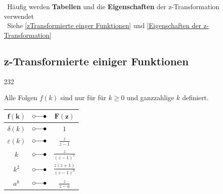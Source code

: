 \textrightarrow\ Häufig werden \textbf{Tabellen} und die \textbf{Eigenschaften} der z-Transformation verwendet \\
\textrightarrow\ Siehe \ref{zTransformierte einger Funktionen} und \ref{Eigenschaften der z-Transformation}



\subsection{z-Transformierte einiger Funktionen}{232}
\label{zTransformierte einger Funktionen}

Alle Folgen $f(k)$ sind nur für für $k \geq 0$ und ganzzahlige $k$ definiert.

\smallskip

\begin{minipage}[t]{0.44\columnwidth}
    \begin{center}
        \renewcommand{\arraystretch}{1.4}
        \begin{tabular}{c c c}
            \toprule
            $\bm{f(k)}$                             & $\laplace$    & $\bm{F(z)}$                                       \\
            \midrule
            $\delta(k)$                             & $\laplace$    & $1$                                               \\
            \midrule
            $\varepsilon(k)$                        & $\laplace$    & $\frac{z}{z-1}$                                   \\
            \midrule
            $k$                                     & $\laplace$    & $\frac{z}{(z-1)^2}$                               \\
            \midrule            
            $k^2$                                   & $\laplace$    & $\frac{z(z+1)}{(z-1)^3}$                          \\
            \midrule
            $a^k$                                   & $\laplace$    & $\frac{z}{z-a}$                                   \\
            \bottomrule
        \end{tabular}
        \renewcommand{\arraystretch}{1}
    \end{center}
\end{minipage}
\hfill
